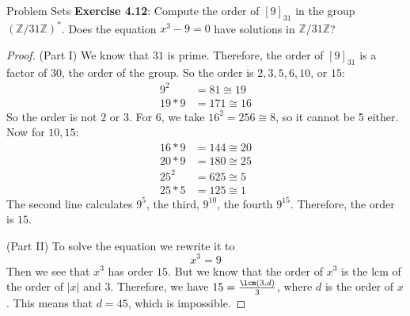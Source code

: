 \documentclass{report}
\begin{document}
\begin{exercises}{Problem Sets}
    \textbf{Exercise 4.12}: Compute the order of $[9]_{31}$ in the group $(\mathbb{Z}/31\mathbb{Z})^{*}$. Does the equation $x^{3} - 9 = 0$ have solutions in $\mathbb{Z}/31\mathbb{Z}$?
        \begin{proof}
            (Part I) We know that $31$ is prime. Therefore, the order of $[9]_{31}$ is a factor of $30$, the order of the group. So the order is $2, 3, 5, 6, 10$, or $15$:
            \begin{align*}
                9^{2}  &= 81 \cong 19  \\
                19 * 9 &= 171 \cong 16 
            \end{align*}
            So the order is not $2$ or $3$. For $6$, we take $16^{2} = 256 \cong 8$, so it cannot be 5 either. Now for $10, 15$:
            \begin{align*}
                16 * 9 &= 144 \cong 20 \\
                20 * 9 &= 180 \cong 25 \\
                25^{2} &= 625 \cong 5  \\
                25 * 5 &= 125 \cong 1    
            \end{align*}
            The second line calculates $9^{5}$, the third, $9^{10}$, the fourth $9^{15}$. Therefore, the order is $15$.

            (Part II) To solve the equation we rewrite it to 
                \begin{equation*}
                    x^{3} = 9
                \end{equation*}
            Then we see that $x^{3}$ has order $15$. But we know that the order of $x^{3}$ is the lcm of the order of $\lvert x \rvert$ and $3$. Therefore, we have $15 = \frac{\lcm(3, d)}{3}$, where $d$ is the order of $x$. This means that $d = 45$, which is impossible. 
        \end{proof}


\end{exercises}
\end{document}
